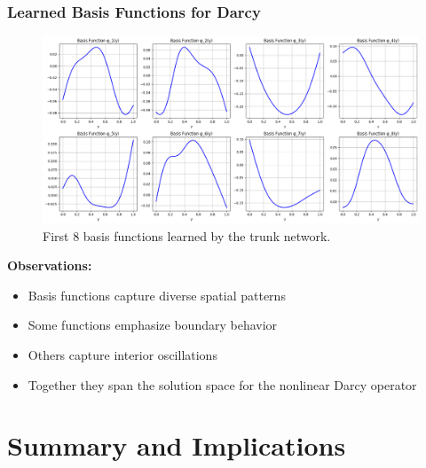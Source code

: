 \documentclass[notes]{beamer}
\begin{document}
\begin{frame}
\frametitle{Learned Basis Functions for Darcy}

\begin{figure}[ht]
	\centering
	\includegraphics[width=\textwidth]{figs/darcy_basis_functions.png}
	\caption*{First 8 basis functions learned by the trunk network.}
\end{figure}

\textbf{Observations:}
\begin{itemize}
    \item Basis functions capture diverse spatial patterns
    \item Some functions emphasize boundary behavior
    \item Others capture interior oscillations
    \item Together they span the solution space for the nonlinear Darcy operator
\end{itemize}

\end{frame}

\section{Summary and Implications}
\end{document}

